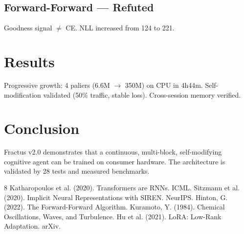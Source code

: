 \subsection{Forward-Forward --- Refuted}
Goodness signal $\neq$ CE. NLL increased from 124 to 221.

\section{Results}
Progressive growth: 4 paliers (6.6M $\to$ 350M) on CPU in 4h44m. Self-modification validated (50\% traffic, stable loss). Cross-session memory verified.

\section{Conclusion}
Fractus v2.0 demonstrates that a continuous, multi-block, self-modifying cognitive agent can be trained on consumer hardware. The architecture is validated by 28 tests and measured benchmarks.


\begin{thebibliography}{8}
 Katharopoulos et al. (2020). Transformers are RNNs. ICML.
 Sitzmann et al. (2020). Implicit Neural Representations with SIREN. NeurIPS.
 Hinton, G. (2022). The Forward-Forward Algorithm.
 Kuramoto, Y. (1984). Chemical Oscillations, Waves, and Turbulence.
 Hu et al. (2021). LoRA: Low-Rank Adaptation. arXiv.
\end{thebibliography}


